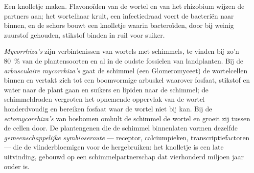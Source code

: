 \begin{omfigure}
{\small Een knolletje maken. Flavonoïden van de wortel en 
van het rhizobium wijzen de partners aan; het wortelhaar krult, een
infectiedraad voert de bacteriën naar binnen, en de schors bouwt een
knolletje waarin bacteroïden, door  bij weinig zuurstof
gehouden, stikstof binden in ruil voor suiker.}
\end{omfigure}

\begin{definition}[Mycorrhiza's]\label{def:b3:microbiomes:mycorrhiza}
\emph{Mycorrhiza's} zijn verbintenissen van wortels met schimmels, te
vinden bij zo'n \qty{80}{\%} van de plantensoorten en al in de oudste
fossielen van landplanten. Bij de \emph{arbusculaire mycorrhiza's} gaat
de schimmel (een Glomeromyceet) de wortelcellen binnen en vertakt zich
tot een boomvormige arbuskel waarover fosfaat, stikstof en water naar
de plant gaan en suikers en lipiden naar de schimmel; de schimmeldraden
vergroten het opnemende oppervlak van de wortel honderdvoudig en
bereiken fosfaat waar de wortel niet bij kan. Bij de
\emph{ectomycorrhiza's} van bosbomen omhult de schimmel de wortel en
groeit zij tussen de cellen door. De plantengenen die de schimmel
binnenlaten vormen dezelfde \emph{gemeenschappelijke symbioseroute} ---
receptor, calciumpieken, transcriptiefactoren --- die de
vlinderbloemigen voor de  hergebruiken: het knolletje is een
late uitvinding, gebouwd op een schimmelpartnerschap dat vierhonderd
miljoen jaar ouder is.
\end{definition}

